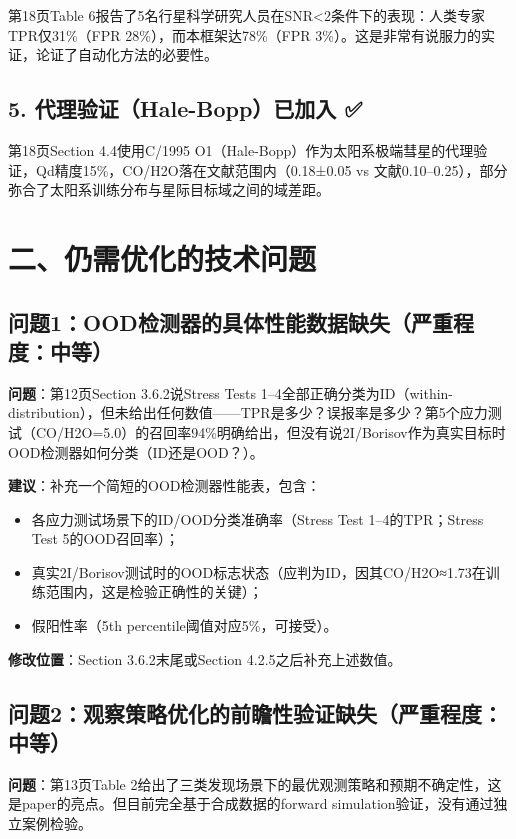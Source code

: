 \documentclass[12pt]{article}
\begin{document}
第18页Table 6报告了5名行星科学研究人员在SNR<2条件下的表现：人类专家TPR仅31\%（FPR 28\%），而本框架达78\%（FPR 3\%）。这是非常有说服力的实证，论证了自动化方法的必要性。

\subsection{5. 代理验证（Hale-Bopp）已加入 ✅}

第18页Section 4.4使用C/1995 O1（Hale-Bopp）作为太阳系极端彗星的代理验证，Qd精度15\%，CO/H2O落在文献范围内（0.18±0.05 vs 文献0.10–0.25），部分弥合了太阳系训练分布与星际目标域之间的域差距。

\section{二、仍需优化的技术问题}

\subsection{问题1：OOD检测器的具体性能数据缺失（严重程度：中等）}

\textbf{问题}：第12页Section 3.6.2说Stress Tests 1–4全部正确分类为ID（within-distribution），但未给出任何数值——TPR是多少？误报率是多少？第5个应力测试（CO/H2O=5.0）的召回率94\%明确给出，但没有说2I/Borisov作为真实目标时OOD检测器如何分类（ID还是OOD？）。

\textbf{建议}：补充一个简短的OOD检测器性能表，包含：
\begin{itemize}
    \item 各应力测试场景下的ID/OOD分类准确率（Stress Test 1–4的TPR；Stress Test 5的OOD召回率）；
    \item 真实2I/Borisov测试时的OOD标志状态（应判为ID，因其CO/H2O≈1.73在训练范围内，这是检验正确性的关键）；
    \item 假阳性率（5th percentile阈值对应5\%，可接受）。
\end{itemize}
\textbf{修改位置}：Section 3.6.2末尾或Section 4.2.5之后补充上述数值。

\subsection{问题2：观察策略优化的前瞻性验证缺失（严重程度：中等）}

\textbf{问题}：第13页Table 2给出了三类发现场景下的最优观测策略和预期不确定性，这是paper的亮点。但目前完全基于合成数据的forward simulation验证，没有通过独立案例检验。
\end{document}

